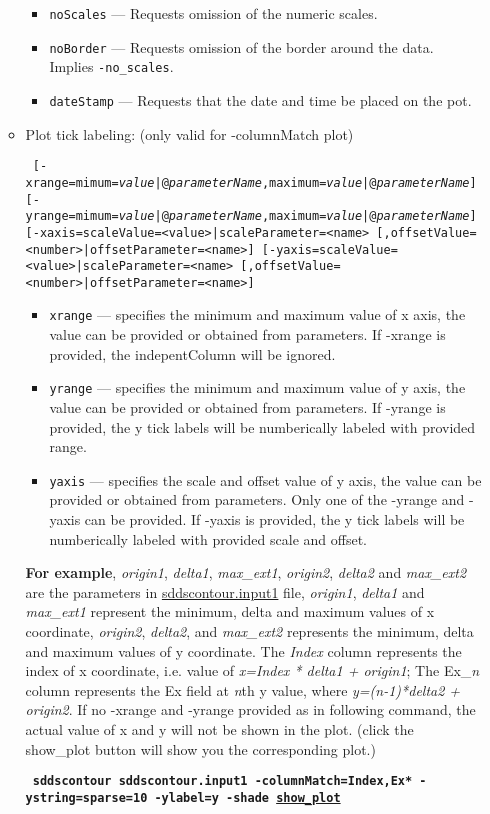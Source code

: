 \begin{itemize}
\begin{itemize}
\begin{itemize}
        \item \verb|noScales| --- Requests omission of the numeric scales.
        \item \verb|noBorder| --- Requests omission of the border around the data.  Implies \verb|-no_scales|.
        \item \verb|dateStamp| --- Requests that the date and time be placed on the pot.
        \end{itemize}
    \item Plot tick labeling: (only valid for -columnMatch plot)
\begin{flushleft}{\tt
[-xrange=mimum={\em value}|@{\em parameterName},maximum={\em value}|@{\em parameterName}] 
[-yrange=mimum={\em value}|@{\em parameterName},maximum={\em value}|@{\em parameterName}]
[-xaxis=scaleValue=<value>|scaleParameter=<name>
   [,offsetValue=<number>|offsetParameter=<name>] 
[-yaxis=scaleValue=<value>|scaleParameter=<name>
   [,offsetValue=<number>|offsetParameter=<name>]
}\end{flushleft}
        \begin{itemize} 
        \item \verb|xrange| --- specifies the minimum and maximum value of x axis, the value can be provided or obtained from parameters. If -xrange is provided, the indepentColumn will be ignored.
        \item \verb|yrange| --- specifies the minimum and maximum value of y axis, the value can be provided or obtained from parameters. If -yrange is provided, the y tick labels will be numberically labeled with provided range.
        \item \verb|yaxis| --- specifies the scale and offset value of y axis, the value can be provided or obtained from parameters. Only one of the -yrange and -yaxis can be provided. If -yaxis is provided, the y tick labels will be numberically labeled with provided scale and offset.
        \end{itemize}
        {\bf For example}, {\em origin1}, {\em delta1}, {\em max\_ext1}, {\em origin2}, {\em delta2} and {\em max\_ext2} are the parameters in \href{http://ops.aps.anl.gov/manuals/example_files/sddscontour.input1}{sddscontour.input1} file, {\em origin1}, {\em delta1} and {\em max\_ext1} represent the minimum, delta and maximum values of x coordinate, {\em origin2}, {\em delta2}, and {\em max\_ext2} represents the minimum, delta and maximum values of y coordinate. The {\em Index} column represents the index of x coordinate, i.e. value of {\em x=Index * delta1 + origin1}; The Ex\_{\em n} column represents the Ex field at {\em n}th y value, where {\em y=(n-1)*delta2 + origin2}. If no -xrange and -yrange provided as in following command, the actual value of x and y will not be shown in the plot. (click the show\_plot button will show you the corresponding plot.) 
       \begin{flushleft}{\tt \bf
            sddscontour sddscontour.input1 -columnMatch=Index,Ex* -ystring=sparse=10 -ylabel=y -shade
         \href{http://ops.aps.anl.gov/manuals/example_files/sddscontour1_img.html}{show\_plot}
        }\end{flushleft}


\end{itemize}
\end{itemize}
